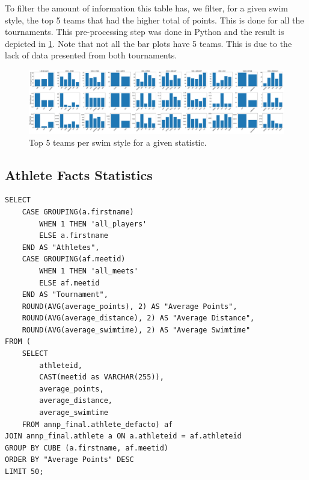 \documentclass[a4paper, 11pt]{article}
\begin{document}
To filter the amount of information this table has, we filter, for a given swim style, the top 5 teams that had the higher total of points. This is done for all the
tournaments. This pre-processing step was done in Python and the result is depicted in \cref{fig:clubs_fact2}. Note that not all the bar plots have 5 teams. This
is due to the lack of data presented from both tournaments.

\begin{figure}[H]
    \centering
    \includegraphics[width=\textwidth]{img/stats_clubs_swim.pdf}
    \caption{Top 5 teams per swim style for a given statistic.}
    \label{fig:clubs_fact2}
\end{figure}

\subsection{Athlete Facts Statistics}

\begin{verbatim}
SELECT
    CASE GROUPING(a.firstname)
        WHEN 1 THEN 'all_players'
        ELSE a.firstname
    END AS "Athletes",
    CASE GROUPING(af.meetid)
        WHEN 1 THEN 'all_meets'
        ELSE af.meetid
    END AS "Tournament",
    ROUND(AVG(average_points), 2) AS "Average Points",
    ROUND(AVG(average_distance), 2) AS "Average Distance",
    ROUND(AVG(average_swimtime), 2) AS "Average Swimtime"
FROM (
    SELECT
        athleteid,
        CAST(meetid as VARCHAR(255)),
        average_points,
        average_distance,
        average_swimtime
    FROM annp_final.athlete_defacto) af
JOIN annp_final.athlete a ON a.athleteid = af.athleteid
GROUP BY CUBE (a.firstname, af.meetid)
ORDER BY "Average Points" DESC
LIMIT 50;
\end{verbatim}
\end{document}
